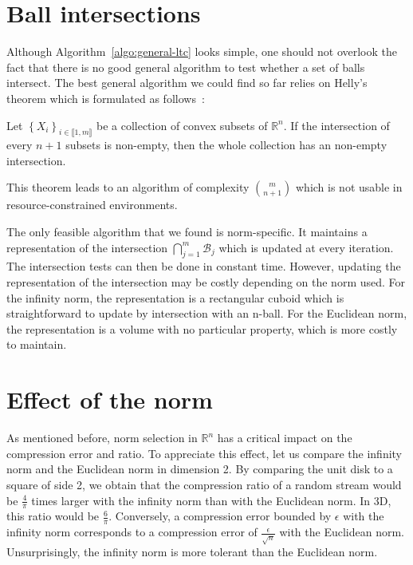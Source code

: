 \section{Ball intersections}

Although Algorithm~\ref{algo:general-ltc} looks simple, one should not
overlook the fact that there is no good general algorithm to test
whether a set of balls intersect. The best general algorithm we could find
so far relies on Helly's theorem which is formulated as follows~\cite{helly1923mengen}:
\begin{theorem}
Let $\left\{ X_i \right\}_{i \in \llbracket 1, m \rrbracket}$ be a collection of convex subsets of $\mathbb{R}^n$. If the intersection of every $n+1$
subsets is non-empty, then the whole collection has an non-empty intersection.
\end{theorem}
\noindent This theorem leads to an algorithm of complexity ${m \choose n+1}$ which is not usable in resource-constrained environments.

The only feasible algorithm that we found is norm-specific. It
maintains a representation of the intersection
$\bigcap_{j=1}^{m}{\mathcal{B}_j}$ which is updated at every iteration.
The intersection tests can then be done in constant time. However,
updating the representation of the intersection may be costly
depending on the norm used. For the infinity norm, the representation
is a rectangular cuboid which is straightforward to update by
intersection with an n-ball.
For the Euclidean norm, the representation is a volume with no particular property,
which is more costly to maintain.

\section{Effect of the norm}

As mentioned before, norm selection in $\mathbb{R}^n$ has a critical
impact on the compression error and ratio. To appreciate this effect,
let us compare the infinity norm and the
Euclidean norm in dimension 2. By comparing the unit disk to a
square of side 2, we obtain that the compression ratio of a random stream would
be $\frac{4}{\pi}$ times larger with the infinity norm than with the 
Euclidean norm. In 3D, this ratio would be $\frac{6}{\pi}$. Conversely, 
a compression error bounded by $\epsilon$ with the infinity norm 
corresponds to a compression error of $\frac{\epsilon}{\sqrt{n}}$ with 
the Euclidean norm. Unsurprisingly, the
infinity norm is more tolerant than the Euclidean norm.

